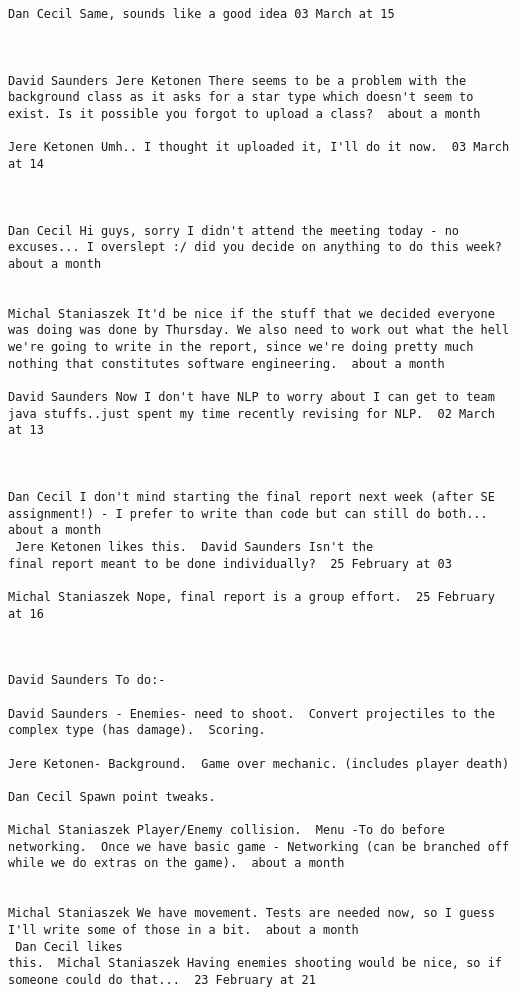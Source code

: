 \begin{verbatim}
Dan Cecil Same, sounds like a good idea 03 March at 15



David Saunders Jere Ketonen There seems to be a problem with the
background class as it asks for a star type which doesn't seem to
exist. Is it possible you forgot to upload a class?  about a month 

Jere Ketonen Umh.. I thought it uploaded it, I'll do it now.  03 March
at 14



Dan Cecil Hi guys, sorry I didn't attend the meeting today - no
excuses... I overslept :/ did you decide on anything to do this week?
about a month 


Michal Staniaszek It'd be nice if the stuff that we decided everyone
was doing was done by Thursday. We also need to work out what the hell
we're going to write in the report, since we're doing pretty much
nothing that constitutes software engineering.  about a month 

David Saunders Now I don't have NLP to worry about I can get to team
java stuffs..just spent my time recently revising for NLP.  02 March
at 13



Dan Cecil I don't mind starting the final report next week (after SE
assignment!) - I prefer to write than code but can still do both...
about a month 
 Jere Ketonen likes this.  David Saunders Isn't the
final report meant to be done individually?  25 February at 03

Michal Staniaszek Nope, final report is a group effort.  25 February
at 16



David Saunders To do:-

David Saunders - Enemies- need to shoot.  Convert projectiles to the
complex type (has damage).  Scoring.

Jere Ketonen- Background.  Game over mechanic. (includes player death)

Dan Cecil Spawn point tweaks.

Michal Staniaszek Player/Enemy collision.  Menu -To do before
networking.  Once we have basic game - Networking (can be branched off
while we do extras on the game).  about a month 


Michal Staniaszek We have movement. Tests are needed now, so I guess
I'll write some of those in a bit.  about a month 
 Dan Cecil likes
this.  Michal Staniaszek Having enemies shooting would be nice, so if
someone could do that...  23 February at 21


\end{verbatim}
